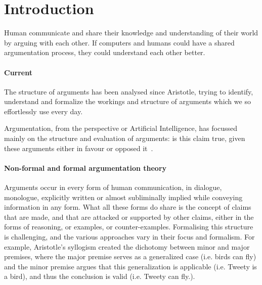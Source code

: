 \documentclass{IOS-Book-Article}
\begin{document}
\section{Introduction}
Human communicate and share their knowledge and understanding of their world by arguing with each other. If computers and humans could have a shared argumentation process, they could understand each other better.

\paragraph{Current}
The structure of arguments has been analysed since Aristotle, trying to identify, understand and formalize the workings and structure of arguments which we so effortlessly use every day.

Argumentation, from the perspective or Artificial Intelligence, has focussed mainly on the structure and evaluation of arguments: is this claim true, given these arguments either in favour or opposed it~\cite{vanEemerenEtal2014ch11}.

\paragraph{Non-formal and formal argumentation theory}
Arguments occur in every form of human communication, in dialogue, monologue, explicitly written or almost subliminally implied while conveying information in any form. What all these forms do share is the concept of claims that are made, and that are attacked or supported by other claims, either in the forms of reasoning, or examples, or counter-examples. Formalising this structure is challenging, and the various approaches vary in their focus and formalism\cite{vanEemerenEtal2014,vanEemerenVerheij2017}. For example, Aristotle's syllogism created the dichotomy between minor and major premises, where the major premise serves as a generalized case (i.e. birds can fly) and the minor premise argues that this generalization is applicable (i.e. Tweety is a bird), and thus the conclusion is valid (i.e. Tweety can fly.).
\end{document}
